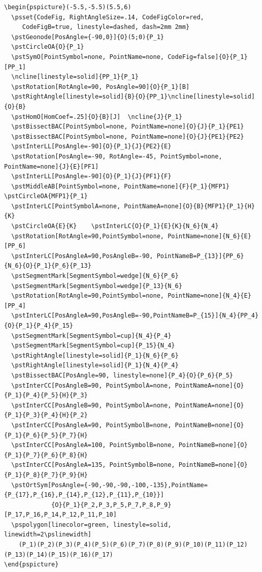 \documentclass[11pt,english,BCOR=10mm,DIV=12,bibliography=totoc,parskip=false,headings=small,
    headinclude=false,footinclude=false,twoside,english]{pst-doc}
\begin{document}
\begin{lstlisting}
\begin{pspicture}(-5.5,-5.5)(5.5,6)
  \psset{CodeFig, RightAngleSize=.14, CodeFigColor=red,
     CodeFigB=true, linestyle=dashed, dash=2mm 2mm}
  \pstGeonode[PosAngle={-90,0}]{O}(5;0){P_1}
  \pstCircleOA{O}{P_1}
  \pstSymO[PointSymbol=none, PointName=none, CodeFig=false]{O}{P_1}[PP_1]
  \ncline[linestyle=solid]{PP_1}{P_1}
  \pstRotation[RotAngle=90, PosAngle=90]{O}{P_1}[B]
  \pstRightAngle[linestyle=solid]{B}{O}{PP_1}\ncline[linestyle=solid]{O}{B}
  \pstHomO[HomCoef=.25]{O}{B}[J]  \ncline{J}{P_1}
  \pstBissectBAC[PointSymbol=none, PointName=none]{O}{J}{P_1}{PE1}
  \pstBissectBAC[PointSymbol=none, PointName=none]{O}{J}{PE1}{PE2}
  \pstInterLL[PosAngle=-90]{O}{P_1}{J}{PE2}{E}
  \pstRotation[PosAngle=-90, RotAngle=-45, PointSymbol=none, PointName=none]{J}{E}[PF1]
  \pstInterLL[PosAngle=-90]{O}{P_1}{J}{PF1}{F}
  \pstMiddleAB[PointSymbol=none, PointName=none]{F}{P_1}{MFP1}  \pstCircleOA{MFP1}{P_1}
  \pstInterLC[PointSymbolA=none, PointNameA=none]{O}{B}{MFP1}{P_1}{H}{K}
  \pstCircleOA{E}{K}    \pstInterLC{O}{P_1}{E}{K}{N_6}{N_4}
  \pstRotation[RotAngle=90,PointSymbol=none, PointName=none]{N_6}{E}[PP_6]
  \pstInterLC[PosAngleA=90,PosAngleB=-90, PointNameB=P_{13}]{PP_6}{N_6}{O}{P_1}{P_6}{P_13}
  \pstSegmentMark[SegmentSymbol=wedge]{N_6}{P_6}
  \pstSegmentMark[SegmentSymbol=wedge]{P_13}{N_6}
  \pstRotation[RotAngle=90,PointSymbol=none, PointName=none]{N_4}{E}[PP_4]
  \pstInterLC[PosAngleA=90,PosAngleB=-90,PointNameB=P_{15}]{N_4}{PP_4}{O}{P_1}{P_4}{P_15}
  \pstSegmentMark[SegmentSymbol=cup]{N_4}{P_4}
  \pstSegmentMark[SegmentSymbol=cup]{P_15}{N_4}
  \pstRightAngle[linestyle=solid]{P_1}{N_6}{P_6}
  \pstRightAngle[linestyle=solid]{P_1}{N_4}{P_4}
  \pstBissectBAC[PosAngle=90, linestyle=none]{P_4}{O}{P_6}{P_5}
  \pstInterCC[PosAngleB=90, PointSymbolA=none, PointNameA=none]{O}{P_1}{P_4}{P_5}{H}{P_3}
  \pstInterCC[PosAngleB=90, PointSymbolA=none, PointNameA=none]{O}{P_1}{P_3}{P_4}{H}{P_2}
  \pstInterCC[PosAngleA=90, PointSymbolB=none, PointNameB=none]{O}{P_1}{P_6}{P_5}{P_7}{H}
  \pstInterCC[PosAngleA=100, PointSymbolB=none, PointNameB=none]{O}{P_1}{P_7}{P_6}{P_8}{H}
  \pstInterCC[PosAngleA=135, PointSymbolB=none, PointNameB=none]{O}{P_1}{P_8}{P_7}{P_9}{H}
  \pstOrtSym[PosAngle={-90,-90,-90,-100,-135},PointName={P_{17},P_{16},P_{14},P_{12},P_{11},P_{10}}]
             {O}{P_1}{P_2,P_3,P_5,P_7,P_8,P_9}[P_17,P_16,P_14,P_12,P_11,P_10]
  \pspolygon[linecolor=green, linestyle=solid, linewidth=2\pslinewidth]
    (P_1)(P_2)(P_3)(P_4)(P_5)(P_6)(P_7)(P_8)(P_9)(P_10)(P_11)(P_12)(P_13)(P_14)(P_15)(P_16)(P_17)
\end{pspicture}
\end{lstlisting}
\end{document}
